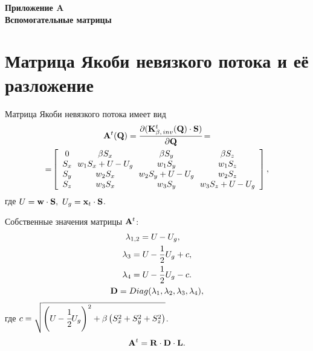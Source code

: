 \newpage
\appendix

\begin{flushleft}
  \LARGE
  \textbf{Приложение A \\ Вспомогательные матрицы}
\end{flushleft}
\label{s:A}
\setcounter{chapter}{1}

\section{Матрица Якоби невязкого потока и её разложение}
Матрица Якоби невязкого потока имеет вид
\begin{gather}
  {\bf{A}}^t ({\bf{Q}}) = \frac{{\partial ({\bf{K}}_{\beta,\, inv}^t ({\bf{Q}}) \cdot {\bf{S}})}}{{\partial
  {\bf{Q}}}} \!= \notag \\ =\! \left[ {\begin{array}{*{20}c}
   0 \!&\! {\beta S_x } \!&\! {\beta S_y } \!&\! {\beta S_z }  \\
   {S_x } \!&\! {w_1 S_x  + U_{}  - U_g } \!&\! {w_1 S_y } \!&\! {w_1 S_z }  \\
   {S_y } \!&\! {w_2 S_x } \!&\! {w_2 S_y  + U_{}  - U_g } \!&\! {w_2 S_z }  \\
   {S_z } \!&\! {w_3 S_x } \!&\! {w_3 S_y } \!&\! {w_3 S_z  + U_{}  - U_g }  \\
  \end{array}} \right],
  \label{A1} 
\end{gather}
где $U = {\bf{w}} \cdot {\bf{S}},\ U_g  = {\bf{x}}_t  \cdot {\bf{S}}$. 

Собственные значения матрицы ${\bf{A}}^t$:
\begin{gather}
  \label{A2}
  \lambda _{1,2} = U_{} - U_g , \quad \notag \\
  \lambda _{3} = U_{} - \frac{1}{2}U_g + c, \\
  \lambda _{4} = U_{} - \frac{1}{2}U_g - c. \notag \\
  {\bf{D}} = Diag(\lambda_{1},\lambda_{2},\lambda_{3},\lambda_{4}),
\end{gather}
где $c = \sqrt {\left({U_{} -\cfrac{1}{2}U_g} \right)^2 + \beta \left( {S_x^2  + S_y^2  + S_z^2 } \right)}$.
\begin{equation}
  {\bf{A}}^t = {\bf{R}}\cdot{\bf{D}}\cdot{\bf{L}}.
\end{equation}

